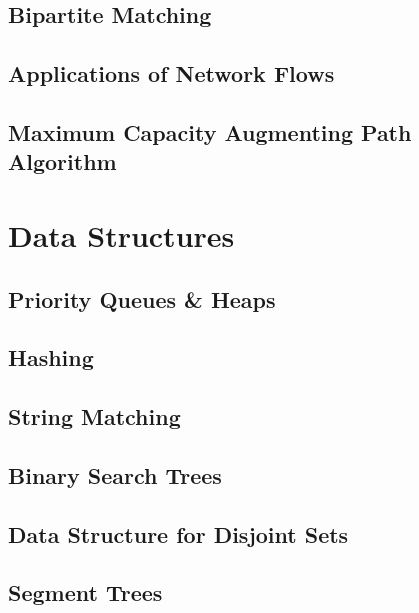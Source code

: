 \documentclass{article}
\begin{document}
\subsection{Bipartite Matching}
\subsection{Applications of Network Flows}
\subsection{Maximum Capacity Augmenting Path Algorithm}
\newpage


\section{Data Structures}
\subsection{Priority Queues \& Heaps}
\subsection{Hashing}
\subsection{String Matching}
\subsection{Binary Search Trees}
\subsection{Data Structure for Disjoint Sets}
\subsection{Segment Trees}
\newpage

\end{document}
